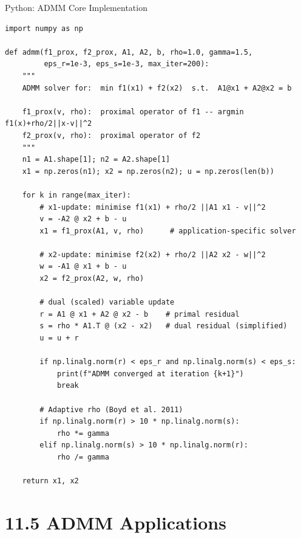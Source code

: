 \documentclass[aspectratio=169,10pt]{beamer}
\begin{document}
\begin{frame}[fragile]{Python: ADMM Core Implementation}
\begin{lstlisting}[style=python]
import numpy as np

def admm(f1_prox, f2_prox, A1, A2, b, rho=1.0, gamma=1.5,
         eps_r=1e-3, eps_s=1e-3, max_iter=200):
    """
    ADMM solver for:  min f1(x1) + f2(x2)  s.t.  A1@x1 + A2@x2 = b

    f1_prox(v, rho):  proximal operator of f1 -- argmin f1(x)+rho/2||x-v||^2
    f2_prox(v, rho):  proximal operator of f2
    """
    n1 = A1.shape[1]; n2 = A2.shape[1]
    x1 = np.zeros(n1); x2 = np.zeros(n2); u = np.zeros(len(b))

    for k in range(max_iter):
        # x1-update: minimise f1(x1) + rho/2 ||A1 x1 - v||^2
        v = -A2 @ x2 + b - u
        x1 = f1_prox(A1, v, rho)      # application-specific solver

        # x2-update: minimise f2(x2) + rho/2 ||A2 x2 - w||^2
        w = -A1 @ x1 + b - u
        x2 = f2_prox(A2, w, rho)

        # dual (scaled) variable update
        r = A1 @ x1 + A2 @ x2 - b    # primal residual
        s = rho * A1.T @ (x2 - x2)   # dual residual (simplified)
        u = u + r

        if np.linalg.norm(r) < eps_r and np.linalg.norm(s) < eps_s:
            print(f"ADMM converged at iteration {k+1}")
            break

        # Adaptive rho (Boyd et al. 2011)
        if np.linalg.norm(r) > 10 * np.linalg.norm(s):
            rho *= gamma
        elif np.linalg.norm(s) > 10 * np.linalg.norm(r):
            rho /= gamma

    return x1, x2
\end{lstlisting}
\end{frame}

\section{11.5 ADMM Applications}
\end{document}
